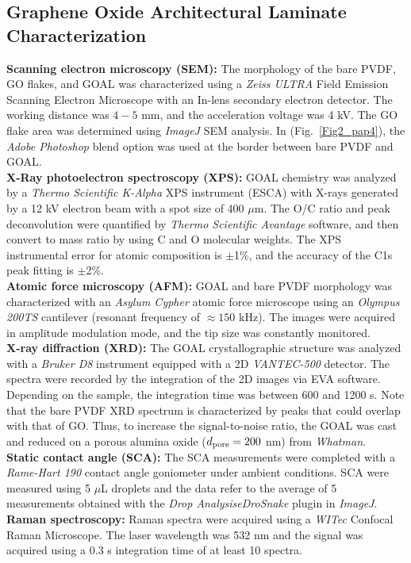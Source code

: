 \subsection{Graphene Oxide Architectural Laminate Characterization}
\textbf{Scanning electron microscopy (SEM):} The morphology of the bare PVDF, GO flakes, and GOAL was characterized using a \textit{Zeiss ULTRA} Field Emission Scanning Electron Microscope with an In-lens secondary electron detector. The working distance was $4-5$ mm, and the acceleration voltage was 4 kV. The GO flake area was determined using \textit{ImageJ} SEM analysis. In (Fig.~\ref{Fig2_pap4}), the \textit{Adobe Photoshop} blend option was used at the border between bare PVDF and GOAL.\\
\textbf{X-Ray photoelectron spectroscopy (XPS):} GOAL chemistry was analyzed by a \textit{Thermo Scientific K-Alpha} XPS instrument (ESCA) with X-rays generated by a 12 kV electron beam with a spot size of 400 $\mu$m. The O/C ratio and peak deconvolution were quantified by \textit{Thermo Scientific Avantage} software, and then convert to mass ratio by using C and O molecular weights. The XPS instrumental error for atomic composition is $\pm$1\%, and the accuracy of the C1s peak fitting is $\pm$2\%.\\
\textbf{Atomic force microscopy (AFM):} GOAL and bare PVDF morphology was characterized with an \textit{Asylum Cypher} atomic force microscope using an \textit{Olympus 200TS} cantilever (resonant frequency of $\approx150$ kHz). The images were acquired in amplitude modulation mode,\cite{Paulo2002} and the tip size was constantly monitored.\cite{santos2012method}\\
\textbf{X-ray diffraction (XRD):} The GOAL crystallographic structure was analyzed with a \textit{Bruker D8} instrument equipped with a 2D \textit{VANTEC-500} detector. The spectra were recorded by the integration of the 2D images via EVA software. Depending on the sample, the integration time was between 600 and 1200 s. Note that the bare PVDF XRD spectrum is characterized by peaks that could overlap with that of GO. Thus, to increase the signal-to-noise ratio, the GOAL was cast and reduced on a porous alumina oxide ($d\textsubscript{pore}=200$ nm) from \textit{Whatman}.\\
\textbf{Static contact angle (SCA):} The SCA measurements were completed with a \textit{Rame-Hart 190} contact angle goniometer under ambient conditions. SCA were measured using 5 $\mu$L droplets and the data refer to the average of 5 measurements obtained with the \textit{Drop AnalysiseDroSnake} plugin in \textit{ImageJ}.\\
\textbf{Raman spectroscopy:} Raman spectra were acquired using a \textit{WITec} Confocal Raman Microscope. The laser wavelength was 532 nm and the signal was acquired using a 0.3 s integration time of at least 10 spectra.

